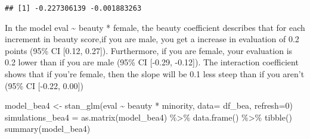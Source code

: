 \documentclass[
]{article}
\newenvironment{Shaded}{\begin{snugshade}}{\end{snugshade}}
\newcommand{\AttributeTok}[1]{\textcolor[rgb]{0.77,0.63,0.00}{#1}}
\newcommand{\DecValTok}[1]{\textcolor[rgb]{0.00,0.00,0.81}{#1}}
\newcommand{\FunctionTok}[1]{\textcolor[rgb]{0.00,0.00,0.00}{#1}}
\newcommand{\NormalTok}[1]{#1}
\newcommand{\OtherTok}[1]{\textcolor[rgb]{0.56,0.35,0.01}{#1}}
\newcommand{\SpecialCharTok}[1]{\textcolor[rgb]{0.00,0.00,0.00}{#1}}
\begin{document}
\begin{Shaded}
\end{Shaded}

\begin{verbatim}
## [1] -0.227306139 -0.001883263
\end{verbatim}

In the model eval \textasciitilde{} beauty * female, the beauty
coefficient describes that for each increment in beauty score,if you are
male, you get a increase in evaluation of 0.2 points (95\% CI {[}0.12,
0.27{]}). Furthermore, if you are female, your evaluation is 0.2 lower
than if you are male (95\% CI {[}-0.29, -0.12{]}). The interaction
coefficient shows that if you're female, then the slope will be 0.1 less
steep than if you aren't (95\% CI {[}-0.22, 0.00{]})

\begin{Shaded}
\begin{Highlighting}[]
\NormalTok{model\_bea4 }\OtherTok{\textless{}{-}} \FunctionTok{stan\_glm}\NormalTok{(eval }\SpecialCharTok{\textasciitilde{}}\NormalTok{ beauty }\SpecialCharTok{*}\NormalTok{ minority, }\AttributeTok{data=}\NormalTok{ df\_bea, }\AttributeTok{refresh=}\DecValTok{0}\NormalTok{)}
\NormalTok{simulations\_bea4 }\OtherTok{=} \FunctionTok{as.matrix}\NormalTok{(model\_bea4) }\SpecialCharTok{\%\textgreater{}\%} \FunctionTok{data.frame}\NormalTok{() }\SpecialCharTok{\%\textgreater{}\%} \FunctionTok{tibble}\NormalTok{()}
\FunctionTok{summary}\NormalTok{(model\_bea4)}
\end{Highlighting}
\end{Shaded}
\end{document}
